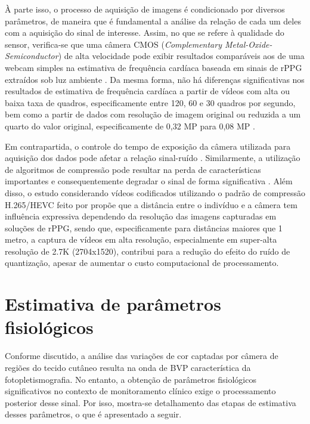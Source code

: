 À parte isso, o processo de aquisição de imagens é condicionado por diversos parâmetros, de maneira que é fundamental a análise da relação de cada um deles com a aquisição do sinal de interesse. Assim, no que se refere à qualidade do sensor, verifica-se que uma câmera CMOS (\textit{Complementary Metal-Oxide-Semiconductor}) de alta velocidade pode exibir resultados comparáveis aos de uma webcam simples na estimativa de frequência cardíaca baseada em sinais de rPPG extraídos sob luz ambiente \cite{sun2012use}. Da mesma forma, não há diferenças significativas nos resultados de estimativa de frequência cardíaca a partir de vídeos com alta ou baixa taxa de quadros, especificamente entre 120, 60 e 30 quadros por segundo, bem como a partir de dados com resolução de imagem original ou reduzida a um quarto do valor original, especificamente de 0,32 MP para 0,08 MP \cite{blackford2015effects}. 
 
 Em contrapartida, o controle do tempo de exposição da câmera utilizada para aquisição dos dados pode afetar a relação sinal-ruído \cite{laurie2020dedicated}. Similarmente, a utilização de algoritmos de compressão pode resultar na perda de características importantes e consequentemente degradar o sinal de forma significativa \cite{mcduff2017impact, nowara2019combating, yu2019stvenrppgnet}. Além disso, o estudo considerando vídeos codificados utilizando o padrão de compressão H.265/HEVC feito por  propõe que a distância entre o indivíduo e a câmera tem influência expressiva dependendo da resolução das imagens capturadas em soluções de rPPG, sendo que, especificamente para distâncias maiores que 1 metro, a captura de vídeos em alta resolução, especialmente em super-alta resolução de 2.7K (2704x1520), contribui para a redução do efeito do ruído de quantização, apesar de aumentar o custo computacional de processamento. 


\section{Estimativa de parâmetros fisiológicos}

Conforme discutido, a análise das variações de cor captadas por câmera de regiões do tecido cutâneo resulta na onda de BVP característica da fotopletismografia. No entanto, a obtenção de parâmetros fisiológicos significativos no contexto de monitoramento clínico exige o processamento posterior desse sinal. Por isso, mostra-se detalhamento das etapas de estimativa desses parâmetros, o que é apresentado a seguir. 

